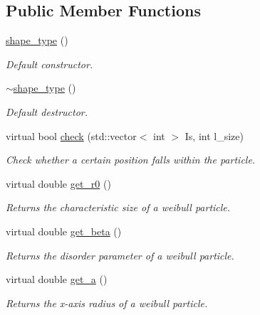 \subsection*{Public Member Functions}
\begin{DoxyCompactItemize}
\item 
\hyperlink{classparticle_1_1shape_1_1shape__type_ab187327a7f6a06f60f4714395f3eca88}{shape\+\_\+type} ()
\begin{DoxyCompactList}\small\item\em Default constructor. \end{DoxyCompactList}\item 
\hyperlink{classparticle_1_1shape_1_1shape__type_a86b549bc6531e04873ca057172ec3f0f}{$\sim$shape\+\_\+type} ()
\begin{DoxyCompactList}\small\item\em Default destructor. \end{DoxyCompactList}\item 
virtual bool \hyperlink{classparticle_1_1shape_1_1shape__type_a64d04f49c8da656d8b8899c431c346fc}{check} (std\+::vector$<$ int $>$ Is, int l\+\_\+size)
\begin{DoxyCompactList}\small\item\em Check whether a certain position falls within the particle. \end{DoxyCompactList}\item 
virtual double \hyperlink{classparticle_1_1shape_1_1shape__type_a062dfaf9cbfe98cdcdc55c34a0463313}{get\+\_\+r0} ()
\begin{DoxyCompactList}\small\item\em Returns the characteristic size of a weibull particle. \end{DoxyCompactList}\item 
virtual double \hyperlink{classparticle_1_1shape_1_1shape__type_a041dd08774f26ffeeb051e1442cb612c}{get\+\_\+beta} ()
\begin{DoxyCompactList}\small\item\em Returns the disorder parameter of a weibull particle. \end{DoxyCompactList}\item 
virtual double \hyperlink{classparticle_1_1shape_1_1shape__type_a7b938aa8c2dada71e8d0b11c6a676449}{get\+\_\+a} ()
\begin{DoxyCompactList}\small\item\em Returns the x-\/axis radius of a weibull particle. \end{DoxyCompactList}\item 

\end{DoxyCompactItemize}
